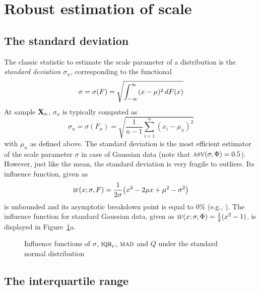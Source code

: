 \section{Robust estimation of scale\label{subsec:scale}}


\subsection{The standard deviation}

The classic statistic to estimate the scale parameter of a distribution 
is the \emph{standard deviation} $\sigma_n$, 
corresponding to the functional 
\[
    \sigma = \sigma(F) = \sqrt{\int_{-\infty}^\infty (x-\mu)^2 \mathop{}\!d F(x)}
\]
At sample $\mathbf X_n$, $\sigma_n$ is typically computed as                   
\[
    \sigma_n = \sigma(F_n) = \sqrt{\frac{1}{n-1} \sum_{i=1}^n (x_i-\mu_n)^2}
\]
with $\mu_n$ as defined above. The standard deviation is the most efficient
estimator of the scale parameter $\sigma$ in case of Gaussian data (note that
$\stsc{ASV}(\sigma, \Phi)=0.5$).                                               
However, just like the mean, the standard
deviation is very fragile to outliers. Its influence function, given as
\[
    \stsc{IF}(x; \sigma, F) = \frac{1}{2\sigma} \left(x^2 - 2\mu x + \mu^2 - \sigma^2\right)
\]
is unbounded and its asymptotic breakdown point is equal to 0\% (e.g.,
\citealp[p. 1275]{rousseeuw:croux:1993}). The influence function for standard
Gaussian data, given as $\stsc{IF}(x; \sigma, \Phi) = \frac{1}{2} (x^2 - 1)$,
is displayed in Figure~\ref{fig:stat:IF_scale}a.



\begin{figure}[h!]
    \centering
    \caption{Influence functions of $\sigma$, $\stsc{IQR}_c$, $\stsc{MAD}$ and $Q$ under the standard normal distribution}
    \label{fig:stat:IF_scale}
\end{figure}


\subsection{The interquartile range}

